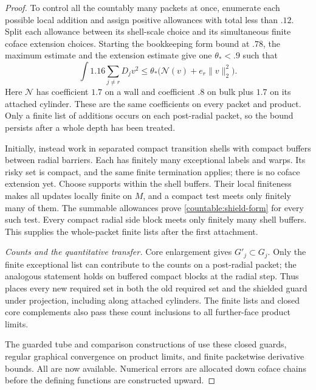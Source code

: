 \begin{proof}
To control all the countably many packets at once, enumerate each
possible local addition and assign positive allowances with total less
than $.12$. Split each allowance between its shell-scale choice and
its simultaneous finite coface extension choices. Starting the
bookkeeping form bound at $.78$, the maximum estimate and the
extension estimate give one $\theta_*<.9$ such that
\begin{equation}\label{countable:shield-form}
 \int1.16\sum_{j\ne r}D_jv^2
 \le\theta_*\bigl(\mathcal N(v)+e_r\|v\|_2^2\bigr).
\end{equation}
Here $\mathcal N$ has coefficient $1.7$ on a wall and coefficient
$.8$ on bulk plus $1.7$ on its attached cylinder. These are the
same coefficients on every packet and product. Only a finite list of
additions occurs on each post-radial packet, so the bound persists
after a whole depth has been treated.

Initially, instead work in separated compact transition shells with
compact buffers between radial barriers. Each has finitely many
exceptional labels and warps. Its risky set is compact, and the same
finite termination applies; there is no coface extension yet. Choose
supports within the shell buffers. Their local finiteness makes all
updates locally finite on $M$, and a compact test meets only finitely
many of them. The summable allowances prove
\eqref{countable:shield-form} for every such test. Every compact radial
side block meets only finitely many shell buffers. This supplies the
whole-packet finite lists after the first attachment.

\emph{Counts and the quantitative transfer.}
Core enlargement gives $G'_j\subset G_j$. Only the finite exceptional
list can contribute to the counts on a post-radial packet; the analogous
statement holds on buffered compact blocks at the radial step.
Thus  places every new required set in both the old
required set and the shielded guard under projection, including along
attached cylinders. The finite lists and closed core complements also
pass these count inclusions to all further-face product limits.

The guarded tube and comparison constructions of
 use these closed guards,
regular graphical convergence on product limits, and finite
packetwise derivative bounds. All are now available. Numerical
errors are allocated down coface chains before the defining functions
are constructed upward.


\end{proof}
